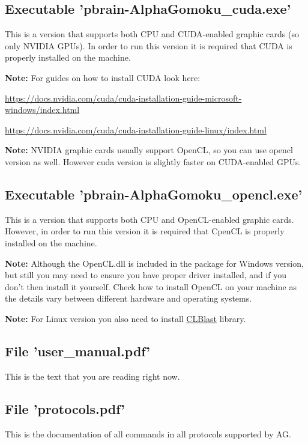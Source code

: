 \documentclass[12pt,a4paper]{article}
\begin{document}
\subsection{Executable 'pbrain-AlphaGomoku{\_}cuda.exe'}
This is a version that supports both CPU and CUDA-enabled graphic cards (so only NVIDIA GPUs). In order to run this version it is required that CUDA is properly installed on the machine.

\textbf{Note:} For guides on how to install CUDA look here:

\href{https://docs.nvidia.com/cuda/cuda-installation-guide-microsoft-windows/index.html}{https://docs.nvidia.com/cuda/cuda-installation-guide-microsoft-windows/index.html}

\href{https://docs.nvidia.com/cuda/cuda-installation-guide-linux/index.html}{https://docs.nvidia.com/cuda/cuda-installation-guide-linux/index.html}

\textbf{Note:} NVIDIA graphic cards usually support OpenCL, so you can use opencl version as well. However cuda version is slightly faster on CUDA-enabled GPUs.

\subsection{Executable 'pbrain-AlphaGomoku{\_}opencl.exe'}
This is a version that supports both CPU and OpenCL-enabled graphic cards. However, in order to run this version it is required that CpenCL is properly installed on the machine.

\textbf{Note:} Although the OpenCL.dll is included in the package for Windows version, but still you may need to ensure you have proper driver installed, and if you don't then install it yourself. Check how to install OpenCL on your machine as the details vary between different hardware and operating systems.

\textbf{Note:} For Linux version you also need to install \href{https://github.com/CNugteren/CLBlast}{CLBlast} library.

\subsection{File 'user{\_}manual.pdf'}
This is the text that you are reading right now.

\subsection{File 'protocols.pdf'}
This is the documentation of all commands in all protocols supported by AG.
\end{document}
